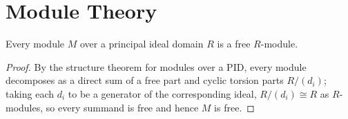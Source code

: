 \section{Module Theory}

\begin{theorem}
Every module $M$ over a principal ideal domain $R$ is a free $R$-module.
\end{theorem}

\begin{proof}
By the structure theorem for modules over a PID, every module decomposes
as a direct sum of a free part and cyclic torsion parts $R/(d_i)$; taking
each $d_i$ to be a generator of the corresponding ideal, $R/(d_i) \cong R$
as $R$-modules, so every summand is free and hence $M$ is free.
\end{proof}
